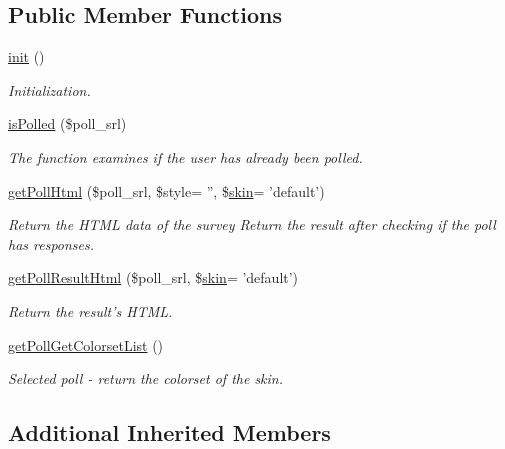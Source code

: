 \subsection*{Public Member Functions}
\begin{DoxyCompactItemize}
\item 
\hyperlink{classpollModel_a201866e44c1ba55917c57b15ae37f984}{init} ()
\begin{DoxyCompactList}\small\item\em Initialization. \end{DoxyCompactList}\item 
\hyperlink{classpollModel_a2364a327ffba2641db0722cdcf0c40d7}{is\-Polled} (\$poll\-\_\-srl)
\begin{DoxyCompactList}\small\item\em The function examines if the user has already been polled. \end{DoxyCompactList}\item 
\hyperlink{classpollModel_adf54e16d01ff98966cfc330c667b9898}{get\-Poll\-Html} (\$poll\-\_\-srl, \$style= '', \$\hyperlink{ko_8install_8php_ab0f2b49fdb57754496b34f6b880cdeaf}{skin}= 'default')
\begin{DoxyCompactList}\small\item\em Return the H\-T\-M\-L data of the survey Return the result after checking if the poll has responses. \end{DoxyCompactList}\item 
\hyperlink{classpollModel_a2353dcbc141fa99d8fe05b223f738372}{get\-Poll\-Result\-Html} (\$poll\-\_\-srl, \$\hyperlink{ko_8install_8php_ab0f2b49fdb57754496b34f6b880cdeaf}{skin}= 'default')
\begin{DoxyCompactList}\small\item\em Return the result's H\-T\-M\-L. \end{DoxyCompactList}\item 
\hyperlink{classpollModel_a350de71f668751cd553fc60aca3fa72c}{get\-Poll\-Get\-Colorset\-List} ()
\begin{DoxyCompactList}\small\item\em Selected poll -\/ return the colorset of the skin. \end{DoxyCompactList}\end{DoxyCompactItemize}
\subsection*{Additional Inherited Members}


